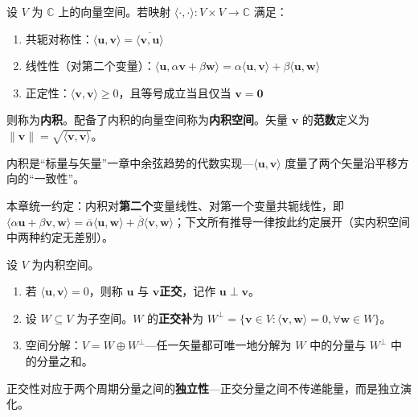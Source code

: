 \begin{definition}[内积空间]\label{def:inner_product_space}
设 $V$ 为 $\mathbb{C}$ 上的向量空间。若映射 $\langle \cdot, \cdot \rangle: V \times V \to \mathbb{C}$ 满足：
\begin{enumerate}[label=(\roman*)]
    \item 共轭对称性：$\langle \mathbf{u}, \mathbf{v} \rangle = \overline{\langle \mathbf{v}, \mathbf{u} \rangle}$
    \item 线性性（对第二个变量）：$\langle \mathbf{u}, \alpha \mathbf{v} + \beta \mathbf{w} \rangle = \alpha \langle \mathbf{u}, \mathbf{v} \rangle + \beta \langle \mathbf{u}, \mathbf{w} \rangle$
    \item 正定性：$\langle \mathbf{v}, \mathbf{v} \rangle \ge 0$，且等号成立当且仅当 $\mathbf{v} = \mathbf{0}$
\end{enumerate}
则称为\textbf{内积}。配备了内积的向量空间称为\textbf{内积空间}。矢量 $\mathbf{v}$ 的\textbf{范数}定义为 $\|\mathbf{v}\| = \sqrt{\langle \mathbf{v}, \mathbf{v} \rangle}$。

内积是“标量与矢量”一章中余弦趋势的代数实现---$\langle \mathbf{u}, \mathbf{v} \rangle$ 度量了两个矢量沿平移方向的“一致性”。

本章统一约定：内积对\textbf{第二个}变量线性、对第一个变量共轭线性，即 $\langle \alpha \mathbf{u} + \beta \mathbf{v}, \mathbf{w} \rangle = \overline{\alpha} \langle \mathbf{u}, \mathbf{w} \rangle + \overline{\beta} \langle \mathbf{v}, \mathbf{w} \rangle$；下文所有推导一律按此约定展开（实内积空间中两种约定无差别）。
\end{definition}

\begin{definition}[正交性与正交补]\label{def:orthogonal_complement}
设 $V$ 为内积空间。
\begin{enumerate}[label=(\roman*)]
    \item 若 $\langle \mathbf{u}, \mathbf{v} \rangle = 0$，则称 $\mathbf{u}$ 与 $\mathbf{v}$\textbf{正交}，记作 $\mathbf{u} \perp \mathbf{v}$。
    \item 设 $W \subseteq V$ 为子空间。$W$ 的\textbf{正交补}为 $W^\perp = \{\mathbf{v} \in V : \langle \mathbf{v}, \mathbf{w} \rangle = 0, \forall \mathbf{w} \in W\}$。
    \item 空间分解：$V = W \oplus W^\perp$---任一矢量都可唯一地分解为 $W$ 中的分量与 $W^\perp$ 中的分量之和。
\end{enumerate}

正交性对应于两个周期分量之间的\textbf{独立性}---正交分量之间不传递能量，而是独立演化。
\end{definition}

